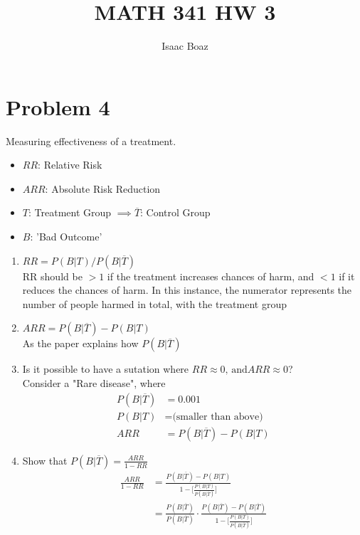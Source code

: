 \documentclass{article}
\title{\vspace{-5ex}MATH 341 HW 3}
\author{Isaac Boaz}
\begin{document}
\maketitle

\section*{Problem 4}
Measuring effectiveness of a treatment.
\begin{itemize}[noitemsep]
    \item \(RR\): Relative Risk
    \item \(ARR\): Absolute Risk Reduction
    \item \(T\): Treatment Group \(\implies \overline{T}\): Control Group
    \item \(B\): 'Bad Outcome'
\end{itemize}


\begin{enumerate}[label=\alph*)]
    \item \(RR = P(B \vert T) / P(B \vert \overline{T})\) \\
    RR should be \(> 1\) if the treatment increases chances of harm, and \(< 1\) if it reduces the chances of harm.
    In this instance, the numerator represents the number of people harmed in total, with the treatment group 
    \item \(ARR = P(B \vert \overline{T}) - P(B \vert T)\) \\
    As the paper explains how \(P(B \vert \overline{T})\) 
    \item Is it possible to have a sutation where \(RR \approx 0 \text{, and} ARR \approx 0\)? \\
    Consider a "Rare disease", where
    \begin{align*}
        P(B \vert \overline{T}) &= 0.001 \\
        P(B \vert T) &= \text{(smaller than above)} \\
        ARR &= P(B \vert \overline{T}) - P(B \vert T)
    \end{align*}
    \item Show that \(P(B \vert \overline{T}) = \frac{ARR}{1-RR}\)
    \begin{align*}
        \frac{
            ARR
        }{
            1-RR
        } &= 
        \frac{
            P(B \vert \overline{T}) - P(B \vert T)
        }
        {
            1 - \lbrack
                \frac{
                    P (B \vert T)
                }{
                    P(B \vert \overline{T})
                } \rbrack
        } \\
        &=
        \frac{
            P(B \vert \overline{T})
        }
        {
            P(B \vert \overline{T})
        } \cdot
        \frac{
            P(B \vert \overline{T}) - P(B \vert \overline{T})
        }
        {
            1 - \lbrack \frac{
                P (B \vert T)
                }
                {
                    P (B \vert \overline{T})
                } \rbrack
        }
    \end{align*}
\end{enumerate}
\end{document}
